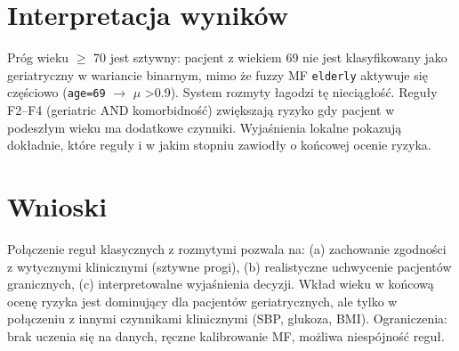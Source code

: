\documentclass[12pt,a4paper]{article}
\begin{document}
\section{Interpretacja wyników}
Próg wieku $\ge$ 70 jest sztywny: pacjent z wiekiem 69 nie jest klasyfikowany jako geriatryczny w wariancie binarnym, mimo że fuzzy MF \texttt{elderly} aktywuje się częściowo (\texttt{age=69} $\to$ $\mu$ \textgreater 0.9). System rozmyty łagodzi tę nieciągłość. Reguły F2--F4 (geriatric AND komorbidność) zwiększają ryzyko gdy pacjent w podeszłym wieku ma dodatkowe czynniki. Wyjaśnienia lokalne pokazują dokładnie, które reguły i w jakim stopniu zawiodły o końcowej ocenie ryzyka.

\section{Wnioski}
Połączenie reguł klasycznych z rozmytymi pozwala na: (a) zachowanie zgodności z wytycznymi klinicznymi (sztywne progi), (b) realistyczne uchwycenie pacjentów granicznych, (c) interpretowalne wyjaśnienia decyzji. Wkład wieku w końcową ocenę ryzyka jest dominujący dla pacjentów geriatrycznych, ale tylko w połączeniu z innymi czynnikami klinicznymi (SBP, glukoza, BMI). Ograniczenia: brak uczenia się na danych, ręczne kalibrowanie MF, możliwa niespójność reguł.
\end{document}
